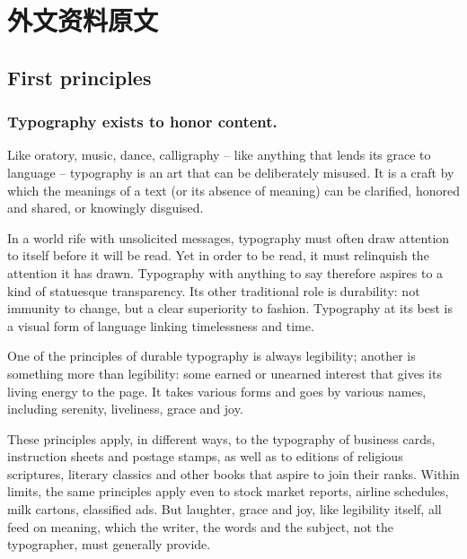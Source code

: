 ﻿%

\chapter{外文资料原文}
\label{cha:engorg}
\section[First Principles]{First principles}

\subsection{Typography exists to honor content.}

Like oratory, music, dance, calligraphy -- like anything that lends its grace to language -- typography is an art that can be deliberately misused. It is a craft by which the meanings of a text (or its absence of meaning) can be clarified, honored and shared, or knowingly disguised.

In a world rife with unsolicited messages, typography must often draw attention to itself before it will be read. Yet in order to be read, it must relinquish the attention it has drawn. Typography with anything to say therefore aspires to a kind of statuesque transparency. Its other traditional role is durability: not immunity to change, but a clear superiority to fashion. Typography at its best is a visual form of language linking timelessness and time.

One of the principles of durable typography is always legibility; another is something more than legibility: some earned or unearned interest that gives its living energy to the page. It takes various forms and goes by various names, including serenity, liveliness, grace and joy.

These principles apply, in different ways, to the typography of business cards, instruction sheets and postage stamps, as well as to editions of religious scriptures, literary classics and other books that aspire to join their ranks. Within limits, the same principles apply even to stock market reports, airline schedules, milk cartons, classified ads. But laughter, grace and joy, like legibility itself, all feed on meaning, which the writer, the words and the subject, not the typographer, must generally provide.

